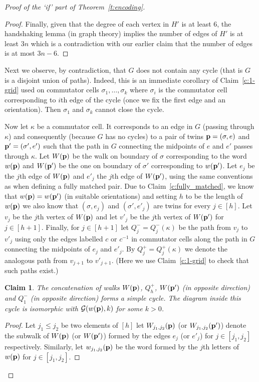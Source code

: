 \documentclass[10pt,a4paper]{article}
\newtheorem{claim}{Claim}[theorem]
\theoremstyle{definition}
\theoremstyle{remark}
\newcommand\GG{\mathcal{G}}
\newcommand\makevec[1]{{\bf #1}}
\def \pp {\makevec{p}}
\begin{document}
\begin{proof}[Proof of the `if' part of Theorem~\ref{t:encoding}]
\begin{proof}
Finally, given that the degree of each vertex in $H'$ is at least $6$, the
handshaking lemma (in graph theory) implies the number of edges of $H'$ is at least $3n$ which is a
contradiction with our earlier claim that the number of edges is at most
$3n-6$.
\end{proof}

Next we observe, by contradiction, that $G$ does not contain any cycle (that is $G$ is a disjoint
union of paths). Indeed, this is an immediate corollary of
Claim~\ref{c:1-grid} used on commutator cells $\sigma_1, \dots, \sigma_k$ where
$\sigma_i$ is the commutator cell corresponding to $i$th edge of the cycle
(once we fix the first edge and an orientation). Then $\sigma_1$ and $\sigma_k$
cannot close the cycle.


Now let $\kappa$ be a commutator cell. It corresponds to an edge in $G$ (passing
through $\kappa$) and consequently (because $G$ has no cycles) 
to a pair of twins $\pp = (\sigma, e)$ and $\pp' = (\sigma', e')$ such that the
path in $G$ connecting the midpoints of $e$ and $e'$ passes through $\kappa$. Let
$W(\pp)$ be the walk on boundary of $\sigma$ corresponding to the word $w(\pp)$
and $W(\pp')$ be the one on boundary of $\sigma'$ corresponding to $w(\pp')$.
Let $e_j$ be the $j$th edge of $W(\pp)$ and $e'_j$ the $j$th edge of $W(\pp')$,
using the same conventions as when defining a fully matched pair. Due to
Claim~\ref{c:fully_matched}, we know that $w(\pp) = w(\pp')$ (in suitable
orientations) and setting $h$ to be the length of $w(\pp)$ we also know that
$(\sigma,e_j)$ and $(\sigma', e'_j)$ are twins for every $j \in [h]$. Let $v_j$
be the $j$th vertex of $W(\pp)$ and let
$v'_j$ be the $j$th vertex of $W(\pp')$ for $j \in [h+1]$. Finally, for $j \in
[h+1]$ let $Q^-_j = Q^-_j(\kappa)$ be the path from $v_j$ to $v'_j$
using only the edges labelled $c$ or $c^{-1}$ in commutator cells
along the path in $G$ connecting the midpoints of $e_j$ and
$e'_j$. By $Q^+_j = Q^+_j(\kappa)$ we denote the analogous path from $v_{j+1}$
to $v'_{j+1}$. (Here we use Claim~\ref{c:1-grid} to check that such paths
exist.)


\begin{claim}
\label{c:replace_commutators}
  The concatenation of walks $W(\pp)$, $Q^+_{h}$, $W(\pp')$ (in opposite direction)
  and $Q^-_1$ (in opposite direction) forms a simple cycle. The diagram inside
  this cycle is isomorphic with $\GG(w(\pp),k)$ for some $k > 0$.
\end{claim}

\begin{proof}
  Let $j_1 \leq j_2$ be two elements of $[h]$ let $W_{j_1,j_2}(\pp)$ (or
  $W_{j_1,j_2}(\pp')$) denote the subwalk of $W(\pp)$
  (or $W(\pp')$) formed by the
  edges $e_j$ (or $e'_j$) for $j \in [j_1,j_2]$ respectively. Similarly, let
  $w_{j_1,j_2}(\pp)$ be the word formed by the $j$th letters of $w(\pp)$ for $j
  \in [j_1,j_2]$.
  


\end{proof}
\end{proof}
\end{document}
